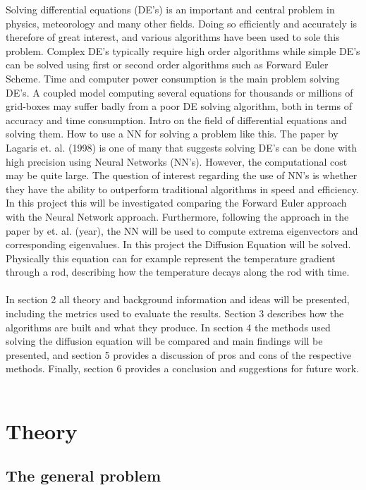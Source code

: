 \documentclass[a4paper,11pt,twocolumn]{article}
\begin{document}
Solving differential equations (DE's) is an important and central problem in physics, meteorology and many other fields. Doing so efficiently and accurately is therefore of great interest, and various algorithms have been used to sole this problem. Complex DE's typically require high order algorithms while simple DE's can be solved using first or second order algorithms such as Forward Euler Scheme. Time and computer power consumption is the main problem solving DE's. A coupled model computing several equations for thousands or millions of grid-boxes may suffer badly from a poor DE solving algorithm, both in terms of accuracy and time consumption.  
Intro on the field of differential equations and solving them. How to use a NN for solving a problem like this. The paper by Lagaris et. al. (1998)\cite{lagaris} is one of many that suggests solving DE's can be done with high precision using Neural Networks (NN's). However, the computational cost may be quite large. 
The question of interest regarding the use of NN's is whether they have the ability to outperform traditional algorithms in speed and efficiency. In this project this will be investigated comparing the Forward Euler approach with the Neural Network approach. Furthermore, following the approach in the paper by \cite{yi} et. al. (year), the NN will be used to compute extrema eigenvectors and corresponding eigenvalues. In this project the Diffusion Equation will be solved. Physically this equation can for example represent the temperature gradient through a rod, describing how the temperature decays along the rod with time.  
\\
\\
In section 2 all theory and background information and ideas will be presented, including the metrics used to evaluate the results. Section 3 describes how the algorithms are built and what they produce. In section 4 the methods used solving the diffusion equation will be compared and main findings will be presented, and section 5 provides a discussion of pros and cons of the respective methods. Finally, section 6 provides a conclusion and suggestions for future work.   
\
\section{Theory}

\subsection{The general problem}
\end{document}

